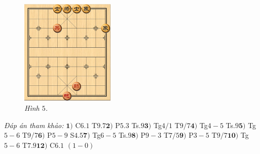 \begin{multicols}{2}
\begin{figure}[H]
		\centering
		\captionsetup{labelformat= empty, justification=centering}
		\includegraphics[width= 0.4\textwidth]{5}
		\caption{\small\textit{\color{gocco}Hình $5$.}}
		\vspace*{-10pt}
	\end{figure}
	\textit{Đáp án tham khảo:} $\pmb{1)}$ C$6.1$ T$9.7$\quad $\pmb{2)}$ P$5.3$ Ts$.9$\quad  $\pmb{3)}$ Tg$4/1$ T$9/7$\quad $\pmb{4)}$ Tg$4-5$ Ts$.9$\quad $\pmb{5)}$ Tg$5-6$ T$9/7$\quad $\pmb{6)}$ P$5-9$ S$4.5$\quad $\pmb{7)}$ Tg$6-5$ Ts$.9$\quad  $\pmb{8)}$ P$9-3$ T$7/5$\quad $\pmb{9)}$ P$3-5$ T$9/7$\quad $\pmb{10)}$ Tg$5-6$ T$7.9$\quad $\pmb{12)}$ C$6.1$ $(1-0)$
\end{multicols}




